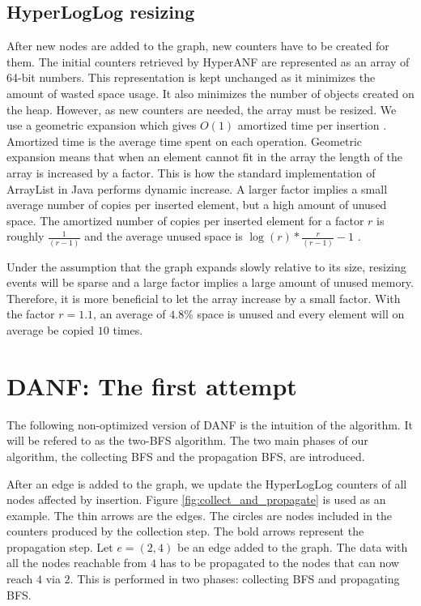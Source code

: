 \subsection{HyperLogLog resizing}
After new nodes are added to the graph, new counters have to be created for them. The initial counters retrieved by HyperANF are represented as an array of 64-bit numbers. This representation is kept unchanged as it minimizes the amount of wasted space usage. It also minimizes the number of objects created on the heap. However, as new counters are needed, the array must be resized. We use a geometric expansion which gives $O(1)$ amortized time per insertion \cite{dynamicarrays}. Amortized time is the average time spent on each operation. Geometric expansion means that when an element cannot fit in the array the length of the array is increased by a factor. This is how the standard implementation of ArrayList in Java performs dynamic increase. A larger factor implies a small average number of copies per inserted element, but a high amount of unused space. The amortized number of copies per inserted element for a factor $r$ is roughly $\frac{1}{(r-1)}$ and the average unused space is $\log(r)*\frac{r}{(r-1)} - 1$ \cite{dynamicarrays}.

Under the assumption that the graph expands slowly relative to its size, resizing events will be sparse and a large factor implies a large amount of unused memory. Therefore, it is more beneficial to let the array increase by a small factor. With the factor $r = 1.1$, an average of $4.8$\% space is unused and every element will on average be copied $10$ times.

\section{DANF: The first attempt}

The following non-optimized version of DANF is the intuition of the algorithm. It will be refered to as the two-BFS algorithm. The two main phases of our algorithm, the collecting BFS and the propagation BFS, are introduced. 

After an edge is added to the graph, we update the HyperLogLog counters of all nodes affected by insertion. Figure \ref{fig:collect_and_propagate} is used as an example. The thin arrows are the edges. The circles are nodes included in the counters produced by the collection step. The bold arrows represent the propagation step. Let $e = (2,4)$ be an edge added to the graph. The data with all the nodes reachable from $4$ has to be propagated to the nodes that can now reach $4$ via $2$. This is performed in two phases: collecting BFS and propagating BFS.


